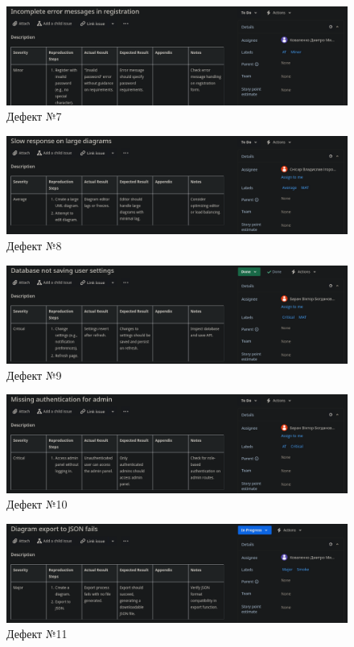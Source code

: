 \documentclass[oneside,14pt]{extarticle}
\begin{document}
\begin{normalsize}
	\begin{figure}[H]
		\centering
		\includegraphics[width=\columnwidth]{8}
		\caption{Дефект №7}
	\end{figure}
	
	\begin{figure}[H]
		\centering
		\includegraphics[width=\columnwidth]{9}
		\caption{Дефект №8}
	\end{figure}
	
	\begin{figure}[H]
		\centering
		\includegraphics[width=\columnwidth]{10}
		\caption{Дефект №9}
	\end{figure}
	
	\begin{figure}[H]
		\centering
		\includegraphics[width=\columnwidth]{11}
		\caption{Дефект №10}
	\end{figure}
	
	\begin{figure}[H]
		\centering
		\includegraphics[width=\columnwidth]{12}
		\caption{Дефект №11}
	\end{figure}
	

\end{normalsize}
\end{document}

